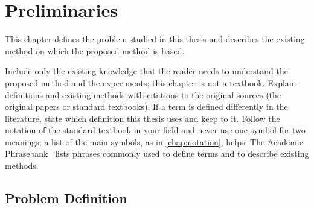 \chapter{Preliminaries}
\label{chap:preliminaries}

This chapter defines the problem studied in this thesis
and describes the existing method on which the proposed method is based.
\begin{writingnote}
Include only the existing knowledge that the reader needs to understand the proposed method and the experiments;
this chapter is not a textbook.
Explain definitions and existing methods with citations to the original sources (the original papers or standard textbooks).
If a term is defined differently in the literature, state which definition this thesis uses and keep to it.
Follow the notation of the standard textbook in your field and never use one symbol for two meanings;
a list of the main symbols, as in \cref{chap:notation}, helps.
The Academic Phrasebank~\cite{morleyphrasebank} lists phrases commonly used to define terms and to describe existing methods.
\end{writingnote}

\section{Problem Definition}
\label{sec:problem}

